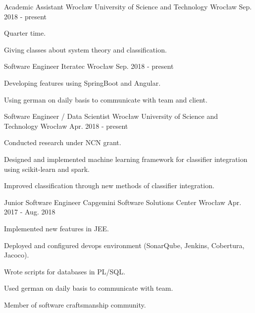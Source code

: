 
\begin{cventries}

    \cventry
    {Academic Assistant}
    {Wrocław University of Science and Technology}
    {Wrocław}
    {Sep. 2018 - present}
    {
    \begin{cvitems}
        \item {Quarter time.}
        \item {Giving classes about system theory and classification.}
    \end{cvitems}
    }

    \cventry
    {Software Engineer}
    {Iteratec}
    {Wrocław}
    {Sep. 2018 - present}
    {
    \begin{cvitems}
        \item {Developing features using SpringBoot and Angular.}
        \item {Using german on daily basis to communicate with team and client.}
    \end{cvitems}
    }

    \cventry
    {Software Engineer / Data Scientist}
    {Wrocław University of Science and Technology}
    {Wrocław}
    {Apr. 2018 - present}
    {
    \begin{cvitems}
        \item {Conducted research under NCN grant.}
        \item {Designed and implemented machine learning framework for classifier integration using scikit-learn and spark.}
        \item {Improved classification through new methods of classifier integration.}
    \end{cvitems}
    }

    \cventry
    {Junior Software Engineer}
    {Capgemini Software Solutions Center}
    {Wrocław}
    {Apr. 2017 - Aug. 2018}
    {
    \begin{cvitems}
        \item {Implemented new features in JEE.}
        \item {Deployed and configured devops environment (SonarQube, Jenkins, Cobertura, Jacoco).}
        \item {Wrote scripts for databases in PL/SQL.}
        \item {Used german on daily basis to communicate with team.}
        \item {Member of software craftsmanship community.}
    \end{cvitems}
    }

\end{cventries}
